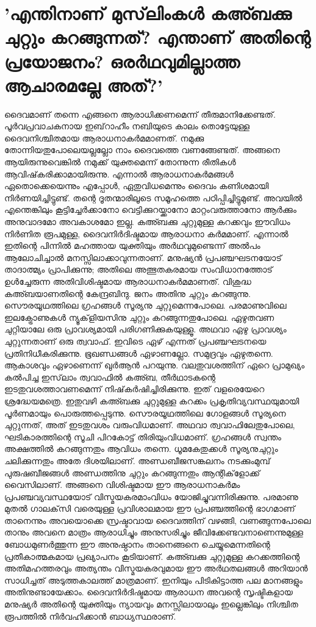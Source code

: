 \section{'എന്തിനാണ് മുസ്‌ലിംകള്‍ കഅ്ബക്കു ചുറ്റും കറങ്ങുന്നത്? എന്താണ് അതിന്റെ പ്രയോജനം? ഒരര്‍ഥവുമില്ലാത്ത ആചാരമല്ലേ അത്?'}
ദൈവമാണ് തന്നെ എങ്ങനെ ആരാധിക്കണമെന്ന് തീരുമാനിക്കേണ്ടത്. പൂര്‍വപ്രവാചകനായ ഇബ്‌റാഹീം നബിയുടെ കാലം തൊട്ടേയുള്ള ദൈവനിശ്ചിതമായ ആരാധനാകര്‍മമാണത്. നമുക്കു തോന്നിയതുപോലെയല്ലല്ലോ നാം ദൈവത്തെ വണങ്ങേണ്ടത്. അങ്ങനെ ആയിരുന്നുവെങ്കില്‍ നമുക്ക് യുക്തമെന്ന് തോന്നുന്ന രീതികള്‍ ആവിഷ്‌കരിക്കാമായിരുന്നു. എന്നാല്‍ ആരാധനാകര്‍മങ്ങള്‍ ഏതൊക്കെയെന്നും എപ്പോള്‍, ഏതുവിധമെന്നും ദൈവം കണിശമായി നിര്‍ണയിച്ചിട്ടുണ്ട്. തന്റെ ദൂതന്മാരിലൂടെ സമൂഹത്തെ പഠിപ്പിച്ചിട്ടുമുണ്ട്. അവയില്‍ എന്തെങ്കിലും കൂട്ടിച്ചേര്‍ക്കാനോ വെട്ടിക്കുറയ്ക്കാനോ മാറ്റംവരുത്താനോ ആര്‍ക്കും അനുവാദമോ അവകാശമോ ഇല്ല. കഅ്ബക്കു ചുറ്റുമുള്ള കറക്കവും ഈവിധം നിര്‍ണിത രൂപമുള്ള, ദൈവനിര്‍ദിഷ്ടമായ ആരാധനാ കര്‍മമാണ്. എന്നാല്‍ ഇതിന്റെ പിന്നില്‍ മഹത്തായ യുക്തിയും അര്‍ഥവുമുണ്ടെന്ന് അല്‍പം ആലോചിച്ചാല്‍ മനസ്സിലാക്കാവുന്നതാണ്.
മനുഷ്യന്‍ പ്രപഞ്ചഘടനയോട് താദാത്മ്യം പ്രാപിക്കുന്നു; അതിലെ അത്ഭുതകരമായ സംവിധാനത്തോട് ഉള്‍ച്ചേരുന്ന അതിവിശിഷ്ടമായ ആരാധനാകര്‍മമാണത്. വിശുദ്ധ കഅ്ബയാണതിന്റെ കേന്ദ്രബിന്ദു. ജനം അതിനു ചുറ്റും കറങ്ങുന്നു. സൌരയൂഥത്തിലെ ഗ്രഹങ്ങള്‍ സൂര്യനു ചുറ്റുമെന്നപോലെ. പരമാണുവിലെ ഇലക്ട്രോണുകള്‍ ന്യൂക്‌ളിയസിനു ചുറ്റും കറങ്ങുന്നതുപോലെ. ഏഴുതവണ ചുറ്റിയാലേ ഒരു പ്രാവശ്യമായി പരിഗണിക്കുകയുള്ളൂ. അഥവാ ഏഴു പ്രാവശ്യം ചുറ്റുന്നതാണ് ഒരു ത്വവാഫ്. ഇവിടെ ഏഴ് എന്നത് പ്രപഞ്ചഘടനയെ പ്രതിനിധീകരിക്കുന്നു. ഭൂഖണ്ഡങ്ങള്‍ ഏഴാണല്ലോ. സമുദ്രവും ഏഴുതന്നെ. ആകാശവും ഏഴാണെന്ന് ഖുര്‍ആന്‍ പറയുന്നു.
വലതുവശത്തിന് ഏറെ പ്രാമുഖ്യം കല്‍പിച്ച ഇസ്‌ലാം ത്വവാഫില്‍ കഅ്ബ, തീര്‍ഥാടകന്റെ ഇടതുവശത്താവണമെന്ന് നിഷ്‌കര്‍ഷിച്ചിരിക്കുന്നു. ഇത് വളരെയേറെ ശ്രദ്ധേയമത്രെ. ഇതുവഴി കഅ്ബക്കു ചുറ്റുമുള്ള കറക്കം പ്രകൃതിവ്യവസ്ഥയുമായി പൂര്‍ണമായും പൊരുത്തപ്പെടുന്നു. സൌരയൂഥത്തിലെ ഗോളങ്ങള്‍ സൂര്യനെ ചുറ്റുന്നത്, അത് ഇടതുവശം വരുംവിധമാണ്. അഥവാ ത്വവാഫിലേതുപോലെ, ഘടികാരത്തിന്റെ സൂചി പിറകോട്ട് തിരിയുംവിധമാണ്. ഗ്രഹങ്ങള്‍ സ്വന്തം അക്ഷത്തില്‍ കറങ്ങുന്നതും ആവിധം തന്നെ. ധൂമകേതുക്കള്‍ സൂര്യനുചുറ്റും ചലിക്കുന്നതും അതേ ദിശയിലാണ്. അണ്ഡബീജസങ്കലനം നടക്കുംമുമ്പ് പുരുഷബീജങ്ങള്‍ അണ്ഡത്തിനു ചുറ്റും കറങ്ങുന്നതും ആന്റിക്‌ളോക്ക് വൈസിലാണ്. അങ്ങനെ വിശിഷ്ടമായ ഈ ആരാധനാകര്‍മം പ്രപഞ്ചവ്യവസ്ഥയോട് വിസ്മയകരമാംവിധം യോജിച്ചുവന്നിരിക്കുന്നു. പരമാണു മുതല്‍ ഗാലക്‌സി വരെയുള്ള പ്രവിശാലമായ ഈ പ്രപഞ്ചത്തിന്റെ ഭാഗമാണ് താനെന്നും അവയൊക്കെ സ്രഷ്ടാവായ ദൈവത്തിന് വഴങ്ങി, വണങ്ങുന്നപോലെ താനും അവനെ മാത്രം ആരാധിച്ചും അനുസരിച്ചും ജീവിക്കേണ്ടവനാണെന്നുമുള്ള ബോധമുണര്‍ത്തുന്ന ഈ അനുഷ്ഠാനം താനെങ്ങനെ ചെയ്യുമെന്നതിന്റെ പ്രതീകാത്മകമായ പ്രഖ്യാപനം കൂടിയാണ്.
കഅ്ബക്കു ചുറ്റുമുള്ള കറക്കത്തിന്റെ അതിമഹത്തരവും അത്യന്തം വിസ്മയകരവുമായ ഈ അര്‍ഥതലങ്ങള്‍ അറിയാന്‍ സാധിച്ചത് അടുത്തകാലത്ത് മാത്രമാണ്. ഇനിയും പിടികിട്ടാത്ത പല മാനങ്ങളും അതിനുണ്ടായേക്കാം. ദൈവനിര്‍ദിഷ്ടമായ ആരാധന അവന്റെ സൃഷ്ടികളായ മനുഷ്യര്‍ അതിന്റെ യുക്തിയും ന്യായവും മനസ്സിലായാലും ഇല്ലെങ്കിലും നിശ്ചിത രൂപത്തില്‍ നിര്‍വഹിക്കാന്‍ ബാധ്യസ്ഥരാണ്.
